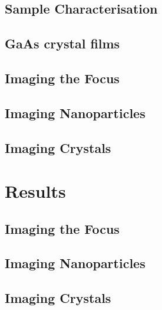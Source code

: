 \subsection{Sample Characterisation}
\subsection{GaAs crystal films}


\subsection{Imaging the Focus}
\subsection{Imaging Nanoparticles}
\subsection{Imaging Crystals}

\section{Results}
\subsection{Imaging the Focus}
\subsection{Imaging Nanoparticles}
\subsection{Imaging Crystals}

